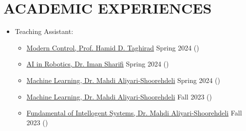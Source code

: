 \documentclass[11pt,a4paper,sans]{moderncv} %
\begin{document}
	\section{ACADEMIC EXPERIENCES}
	\begin{itemize}
 		\item Teaching Assistant:
		\begin{itemize}
  	\item {}  \href{https://github.com/MJAHMADEE/Industrial_Control_Course}{Modern Control, }\textcolor{gray}{\href{https://aras.kntu.ac.ir/taghirad/}{Prof. Hamid D. Taghirad}}  \hfill Spring 2024 (\href{https://github.com/MJAHMADEE/ModernControl2024W}{})
   \item {}  \href{https://github.com/MJAHMADEE/AIinRobotics2024W}{AI in Robotics, }\textcolor{gray}{\href{https://isharifi.ir/site/}{Dr. Iman Sharifi}}  \hfill Spring 2024 (\href{https://github.com/MJAHMADEE/AIinRobotics2024W}{})
   	\item {} \href{https://github.com/MJAHMADEE/MachineLearning2023}{Machine Learning, }\textcolor{gray}{\href{https://wp.kntu.ac.ir/aliyari/}{Dr. Mahdi Aliyari-Shoorehdeli}}    \hfill Spring 2024 (\href{https://github.com/MJAHMADEE/MachineLearning2024W}{})
    
			\item {} \href{https://github.com/MJAHMADEE/MachineLearning2023}{Machine Learning, }\textcolor{gray}{\href{https://wp.kntu.ac.ir/aliyari/}{Dr. Mahdi Aliyari-Shoorehdeli}}    \hfill Fall 2023 (\href{https://github.com/MJAHMADEE/MachineLearning2023}{})
       
   
			\item {}  \href{https://wp.kntu.ac.ir/aliyari/}{Fundamental of Intellogent Systems, }\textcolor{gray}{\href{https://wp.kntu.ac.ir/aliyari/}{Dr. Mahdi Aliyari-Shoorehdeli}}  \hfill Fall 2023 (\href{https://github.com/MJAHMADEE/MachineLearning2023}{})
       

\end{itemize}
\end{itemize}
\end{document}

